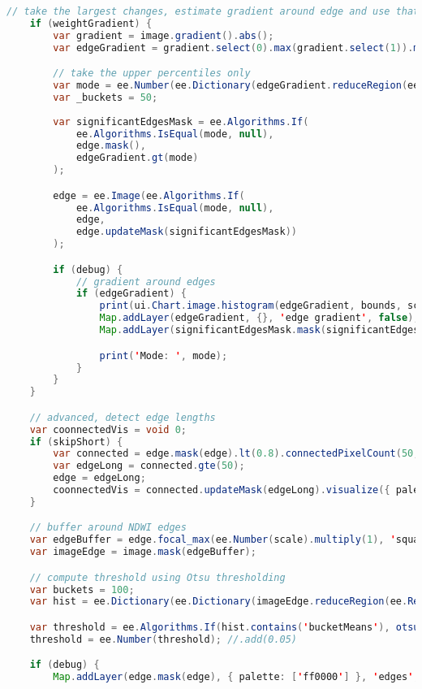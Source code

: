 \begin{lstlisting}[language=Java, basicstyle=\tiny]
    // take the largest changes, estimate gradient around edge and use that as a weight
    if (weightGradient) {
        var gradient = image.gradient().abs();
        var edgeGradient = gradient.select(0).max(gradient.select(1)).mask(edge.gt(th)).reproject(image.projection().scale(2, 2));

        // take the upper percentiles only
        var mode = ee.Number(ee.Dictionary(edgeGradient.reduceRegion(ee.Reducer.mode(), bounds, scale)).values().get(0));
        var _buckets = 50;
        
        var significantEdgesMask = ee.Algorithms.If(
            ee.Algorithms.IsEqual(mode, null), 
            edge.mask(), 
            edgeGradient.gt(mode)
        );

        edge = ee.Image(ee.Algorithms.If(
            ee.Algorithms.IsEqual(mode, null), 
            edge,
            edge.updateMask(significantEdgesMask))
        );

        if (debug) {
            // gradient around edges
            if (edgeGradient) {
                print(ui.Chart.image.histogram(edgeGradient, bounds, scale, _buckets));
                Map.addLayer(edgeGradient, {}, 'edge gradient', false);
                Map.addLayer(significantEdgesMask.mask(significantEdgesMask), {}, 'significant edges', false);

                print('Mode: ', mode);
            }
        }
    }

    // advanced, detect edge lengths
    var coonnectedVis = void 0;
    if (skipShort) {
        var connected = edge.mask(edge).lt(0.8).connectedPixelCount(50, true);
        var edgeLong = connected.gte(50);
        edge = edgeLong;
        coonnectedVis = connected.updateMask(edgeLong).visualize({ palette: ['ffffff', 'ff0000'], min: 0, max: 50 });
    }

    // buffer around NDWI edges
    var edgeBuffer = edge.focal_max(ee.Number(scale).multiply(1), 'square', 'meters');
    var imageEdge = image.mask(edgeBuffer);

    // compute threshold using Otsu thresholding
    var buckets = 100;
    var hist = ee.Dictionary(ee.Dictionary(imageEdge.reduceRegion(ee.Reducer.histogram(buckets), bounds, scale)).values().get(0));

    var threshold = ee.Algorithms.If(hist.contains('bucketMeans'), otsu(hist), 0);
    threshold = ee.Number(threshold); //.add(0.05)

    if (debug) {
        Map.addLayer(edge.mask(edge), { palette: ['ff0000'] }, 'edges', false);


\end{lstlisting}
